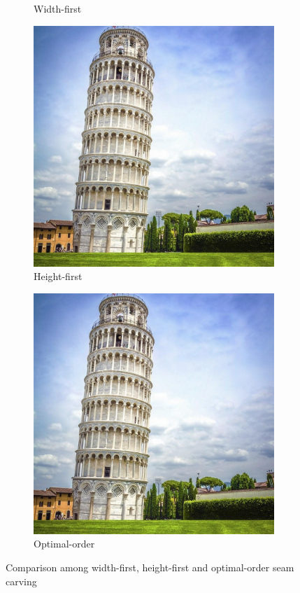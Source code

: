 \documentclass[final]{cvpr}
\begin{document}
\begin{figure}[htb]
\begin{center}
\begin{subfigure}[b]{0.30\linewidth}
    \caption{Width-first}
\end{subfigure}
\begin{subfigure}[b]{0.30\linewidth}
    \includegraphics[width=\textwidth]{pisa_seam_carving_height_first.jpg}
    \caption{Height-first}
\end{subfigure}
\begin{subfigure}[b]{0.30\linewidth}
    \includegraphics[width=\textwidth]{pisa_seam_carving_optimal_order.jpg}
    \caption{Optimal-order}
\end{subfigure}
\end{center}
\caption{Comparison among width-first, height-first and optimal-order seam carving}
\label{fig:pisa_optimal_order}
\end{figure}
\end{document}
